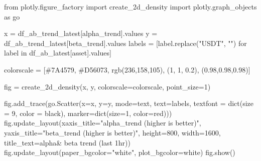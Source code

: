 \documentclass[
  letterpaper,
  DIV=11,
  numbers=noendperiod]{scrartcl}
\newenvironment{Shaded}{\begin{snugshade}}{\end{snugshade}}
\newcommand{\BuiltInTok}[1]{\textcolor[rgb]{0.00,0.23,0.31}{#1}}
\newcommand{\ControlFlowTok}[1]{\textcolor[rgb]{0.00,0.23,0.31}{#1}}
\newcommand{\DecValTok}[1]{\textcolor[rgb]{0.68,0.00,0.00}{#1}}
\newcommand{\FloatTok}[1]{\textcolor[rgb]{0.68,0.00,0.00}{#1}}
\newcommand{\ImportTok}[1]{\textcolor[rgb]{0.00,0.46,0.62}{#1}}
\newcommand{\KeywordTok}[1]{\textcolor[rgb]{0.00,0.23,0.31}{#1}}
\newcommand{\NormalTok}[1]{\textcolor[rgb]{0.00,0.23,0.31}{#1}}
\newcommand{\OperatorTok}[1]{\textcolor[rgb]{0.37,0.37,0.37}{#1}}
\newcommand{\StringTok}[1]{\textcolor[rgb]{0.13,0.47,0.30}{#1}}
\begin{document}
\begin{Shaded}
\begin{Highlighting}[]
\ImportTok{from}\NormalTok{ plotly.figure\_factory }\ImportTok{import}\NormalTok{ create\_2d\_density}
\ImportTok{import}\NormalTok{ plotly.graph\_objects }\ImportTok{as}\NormalTok{ go}

\NormalTok{x }\OperatorTok{=}\NormalTok{ df\_ab\_trend\_latest[}\StringTok{\textquotesingle{}alpha\_trend\textquotesingle{}}\NormalTok{].values}
\NormalTok{y }\OperatorTok{=}\NormalTok{ df\_ab\_trend\_latest[}\StringTok{\textquotesingle{}beta\_trend\textquotesingle{}}\NormalTok{].values}
\NormalTok{labels }\OperatorTok{=}\NormalTok{ [label.replace(}\StringTok{"USDT"}\NormalTok{, }\StringTok{""}\NormalTok{) }\ControlFlowTok{for}\NormalTok{ label }\KeywordTok{in}\NormalTok{ df\_ab\_latest[}\StringTok{\textquotesingle{}asset\textquotesingle{}}\NormalTok{].values]}

\NormalTok{colorscale }\OperatorTok{=}\NormalTok{ [}\StringTok{\textquotesingle{}\#7A4579\textquotesingle{}}\NormalTok{, }\StringTok{\textquotesingle{}\#D56073\textquotesingle{}}\NormalTok{, }\StringTok{\textquotesingle{}rgb(236,158,105)\textquotesingle{}}\NormalTok{, (}\DecValTok{1}\NormalTok{, }\DecValTok{1}\NormalTok{, }\FloatTok{0.2}\NormalTok{), (}\FloatTok{0.98}\NormalTok{,}\FloatTok{0.98}\NormalTok{,}\FloatTok{0.98}\NormalTok{)]}

\NormalTok{fig }\OperatorTok{=}\NormalTok{ create\_2d\_density(x, y, colorscale}\OperatorTok{=}\NormalTok{colorscale, point\_size}\OperatorTok{=}\DecValTok{1}\NormalTok{)}

\NormalTok{fig.add\_trace(go.Scatter(x}\OperatorTok{=}\NormalTok{x, y}\OperatorTok{=}\NormalTok{y, mode}\OperatorTok{=}\StringTok{\textquotesingle{}text\textquotesingle{}}\NormalTok{, text}\OperatorTok{=}\NormalTok{labels, textfont }\OperatorTok{=} \BuiltInTok{dict}\NormalTok{(size }\OperatorTok{=} \DecValTok{9}\NormalTok{, color }\OperatorTok{=} \StringTok{\textquotesingle{}black\textquotesingle{}}\NormalTok{), marker}\OperatorTok{=}\BuiltInTok{dict}\NormalTok{(size}\OperatorTok{=}\DecValTok{1}\NormalTok{, color}\OperatorTok{=}\StringTok{\textquotesingle{}red\textquotesingle{}}\NormalTok{)))}
\NormalTok{fig.update\_layout(xaxis\_title}\OperatorTok{=}\StringTok{"alpha\_trend (higher is better)"}\NormalTok{, yaxis\_title}\OperatorTok{=}\StringTok{"beta\_trend (higher is better)"}\NormalTok{, height}\OperatorTok{=}\DecValTok{800}\NormalTok{, width}\OperatorTok{=}\DecValTok{1600}\NormalTok{, title\_text}\OperatorTok{=}\StringTok{\textquotesingle{}alpha\& beta trend (last 1hr)\textquotesingle{}}\NormalTok{)}
\NormalTok{fig.update\_layout(paper\_bgcolor}\OperatorTok{=}\StringTok{"white"}\NormalTok{, plot\_bgcolor}\OperatorTok{=}\StringTok{\textquotesingle{}white\textquotesingle{}}\NormalTok{)}
\NormalTok{fig.show()}
\end{Highlighting}
\end{Shaded}
\end{document}
